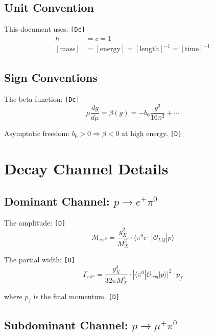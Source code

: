 \documentclass[11pt,a4paper]{article}
\newcommand{\tagD}{\textcolor{green!50!black}{\texttt{[D]}}}
\newcommand{\tagDc}{\textcolor{blue!70!black}{\texttt{[Dc]}}}
\theoremstyle{definition}
\begin{document}
\subsection{Unit Convention}
\label{app:units}

This document uses: \tagDc{}
\begin{align}
\label{eq:units-1}
\hbar &= c = 1 \\
\label{eq:units-2}
[\text{mass}] &= [\text{energy}] = [\text{length}]^{-1} = [\text{time}]^{-1}
\end{align}

\subsection{Sign Conventions}
\label{app:signs}

The beta function: \tagDc{}
\begin{equation}
\label{eq:sign-beta}
\mu\frac{dg}{d\mu} = \beta(g) = -b_0 \frac{g^3}{16\pi^2} + \cdots
\end{equation}

Asymptotic freedom: $b_0 > 0 \Rightarrow \beta < 0$ at high energy. \tagD{}

\section{Decay Channel Details}
\label{app:channels}

\subsection{Dominant Channel: $p \to e^+ \pi^0$}
\label{app:epi0}

The amplitude: \tagD{}
\begin{equation}
\label{eq:ch-epi0-amp}
\mathcal{M}_{e\pi^0} = \frac{g_X^2}{M_X^2} \cdot \langle \pi^0 e^+ | \mathcal{O}_{LQ} | p \rangle
\end{equation}

The partial width: \tagD{}
\begin{equation}
\label{eq:ch-epi0-width}
\Gamma_{e\pi^0} = \frac{g_X^4}{32\pi M_X^4} \cdot |\langle \pi^0 | \mathcal{O}_{qqq} | p \rangle|^2 \cdot p_f
\end{equation}

where $p_f$ is the final momentum. \tagD{}

\subsection{Subdominant Channel: $p \to \mu^+ \pi^0$}
\label{app:mupi0}
\end{document}
